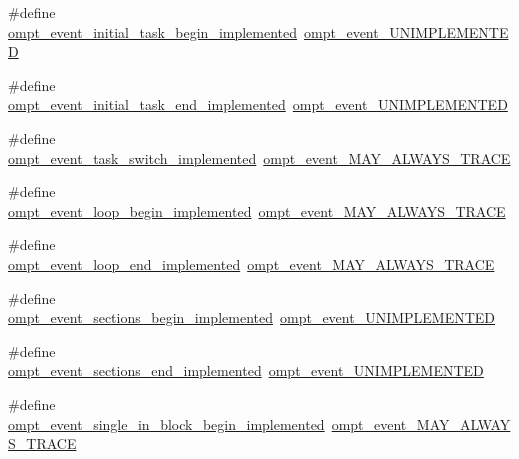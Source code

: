 \begin{DoxyCompactItemize}
\item 
\#define \hyperlink{ompt-event-specific_8h_aec50ed43a91c582866e767f9fd2a18dd}{ompt\-\_\-event\-\_\-initial\-\_\-task\-\_\-begin\-\_\-implemented}~\hyperlink{ompt-event-specific_8h_a5719430a79b410eee8d68fcec0fbf8f2}{ompt\-\_\-event\-\_\-\-U\-N\-I\-M\-P\-L\-E\-M\-E\-N\-T\-E\-D}
\item 
\#define \hyperlink{ompt-event-specific_8h_a8af18e42e9e32223808312e8b1e57776}{ompt\-\_\-event\-\_\-initial\-\_\-task\-\_\-end\-\_\-implemented}~\hyperlink{ompt-event-specific_8h_a5719430a79b410eee8d68fcec0fbf8f2}{ompt\-\_\-event\-\_\-\-U\-N\-I\-M\-P\-L\-E\-M\-E\-N\-T\-E\-D}
\item 
\#define \hyperlink{ompt-event-specific_8h_ac4112e4950b04d29cf19cc8ff69088e8}{ompt\-\_\-event\-\_\-task\-\_\-switch\-\_\-implemented}~\hyperlink{ompt-event-specific_8h_a81d63d53ff090774864cdd033effe56e}{ompt\-\_\-event\-\_\-\-M\-A\-Y\-\_\-\-A\-L\-W\-A\-Y\-S\-\_\-\-T\-R\-A\-C\-E}
\item 
\#define \hyperlink{ompt-event-specific_8h_ab530c44febe3332687e1cc8ae71b166b}{ompt\-\_\-event\-\_\-loop\-\_\-begin\-\_\-implemented}~\hyperlink{ompt-event-specific_8h_a81d63d53ff090774864cdd033effe56e}{ompt\-\_\-event\-\_\-\-M\-A\-Y\-\_\-\-A\-L\-W\-A\-Y\-S\-\_\-\-T\-R\-A\-C\-E}
\item 
\#define \hyperlink{ompt-event-specific_8h_a54f81460a3869f31b11af17d619b4242}{ompt\-\_\-event\-\_\-loop\-\_\-end\-\_\-implemented}~\hyperlink{ompt-event-specific_8h_a81d63d53ff090774864cdd033effe56e}{ompt\-\_\-event\-\_\-\-M\-A\-Y\-\_\-\-A\-L\-W\-A\-Y\-S\-\_\-\-T\-R\-A\-C\-E}
\item 
\#define \hyperlink{ompt-event-specific_8h_ac2e0213ada27e4698b72c6f4fe321f5d}{ompt\-\_\-event\-\_\-sections\-\_\-begin\-\_\-implemented}~\hyperlink{ompt-event-specific_8h_a5719430a79b410eee8d68fcec0fbf8f2}{ompt\-\_\-event\-\_\-\-U\-N\-I\-M\-P\-L\-E\-M\-E\-N\-T\-E\-D}
\item 
\#define \hyperlink{ompt-event-specific_8h_a5f4e2bf60610bfcb9039ce2ff4d58199}{ompt\-\_\-event\-\_\-sections\-\_\-end\-\_\-implemented}~\hyperlink{ompt-event-specific_8h_a5719430a79b410eee8d68fcec0fbf8f2}{ompt\-\_\-event\-\_\-\-U\-N\-I\-M\-P\-L\-E\-M\-E\-N\-T\-E\-D}
\item 
\#define \hyperlink{ompt-event-specific_8h_ad2883ccb09b0ba1d82430995c70a714d}{ompt\-\_\-event\-\_\-single\-\_\-in\-\_\-block\-\_\-begin\-\_\-implemented}~\hyperlink{ompt-event-specific_8h_a81d63d53ff090774864cdd033effe56e}{ompt\-\_\-event\-\_\-\-M\-A\-Y\-\_\-\-A\-L\-W\-A\-Y\-S\-\_\-\-T\-R\-A\-C\-E}
\item 

\end{DoxyCompactItemize}
